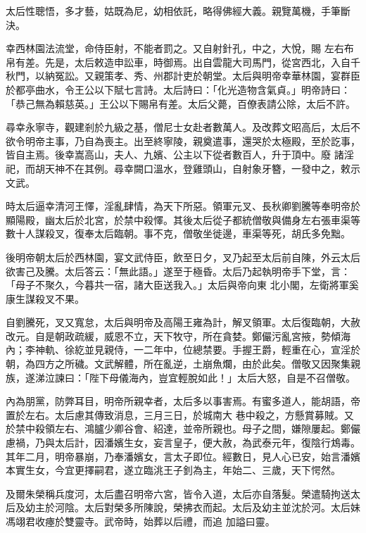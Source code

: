 \begin{pinyinscope}
 太后性聰悟，多才藝，姑既為尼，幼相依託，略得佛經大義。親覽萬機，手筆斷決。



 幸西林園法流堂，命侍臣射，不能者罰之。又自射針孔，中之，大悅，賜
 左右布帛有差。先是，太后敕造申訟車，時御焉。出自雲龍大司馬門，從宮西北，入自千秋門，以納冤訟。又親策孝、秀、州郡計吏於朝堂。太后與明帝幸華林園，宴群臣於都亭曲水，令王公以下賦七言詩。太后詩曰：「化光造物含氣貞。」明帝詩曰：「恭己無為賴慈英。」王公以下賜帛有差。太后父薨，百僚表請公除，太后不許。



 尋幸永寧寺，觀建剎於九級之基，僧尼士女赴者數萬人。及改葬文昭高后，太后不欲令明帝主事，乃自為喪主。出至終寧陵，親奠遣事，還哭於太極殿，至於訖事，皆自主焉。後幸嵩高山，夫人、九嬪、公主以下從者數百人，升于頂中。廢
 諸淫祀，而胡天神不在其例。尋幸闕口溫水，登雞頭山，自射象牙簪，一發中之，敕示文武。



 時太后逼幸清河王懌，淫亂肆情，為天下所惡。領軍元叉、長秋卿劉騰等奉明帝於顯陽殿，幽太后於北宮，於禁中殺懌。其後太后從子都統僧敬與備身左右張車渠等數十人謀殺叉，復奉太后臨朝。事不克，僧敬坐徙邊，車渠等死，胡氏多免黜。



 後明帝朝太后於西林園，宴文武侍臣，飲至日夕，叉乃起至太后前自陳，外云太后欲害己及騰。太后答云：「無此語。」遂至于極昏。太后乃起執明帝手下堂，言：「母子不聚久，今暮共一宿，諸大臣送我入。」太后與帝向東
 北小閣，左衛將軍奚康生謀殺叉不果。



 自劉騰死，叉又寬怠，太后與明帝及高陽王雍為計，解叉領軍。太后復臨朝，大赦改元。自是朝政疏緩，威恩不立，天下牧守，所在貪婪。鄭儼污亂宮掖，勢傾海內；李神軌、徐紇並見親侍，一二年中，位總禁要。手握王爵，輕重在心，宣淫於朝，為四方之所穢。文武解體，所在亂逆，土崩魚爛，由於此矣。僧敬又因聚集親族，遂涕泣諫曰：「陛下母儀海內，豈宜輕脫如此！」太后大怒，自是不召僧敬。



 內為朋黨，防弊耳目，明帝所親幸者，太后多以事害焉。有蜜多道人，能胡語，帝置於左右。太后慮其傳致消息，三月三日，於城南大
 巷中殺之，方懸賞募賊。又於禁中殺領左右、鴻臚少卿谷會、紹達，並帝所親也。母子之間，嫌隙屢起。鄭儼慮禍，乃與太后計，因潘嬪生女，妄言皇子，便大赦，為武泰元年，復陰行鴆毒。其年二月，明帝暴崩，乃奉潘嬪女，言太子即位。經數日，見人心已安，始言潘嬪本實生女，今宜更擇嗣君，遂立臨洮王子釗為主，年始二、三歲，天下愕然。



 及爾朱榮稱兵度河，太后盡召明帝六宮，皆令入道，太后亦自落髮。榮遣騎拘送太后及幼主於河陰。太后對榮多所陳說，榮拂衣而起。太后及幼主並沈於河。太后妹馮翊君收瘞於雙靈寺。武帝時，始葬以后禮，而追
 加謚曰靈。




\end{pinyinscope}
